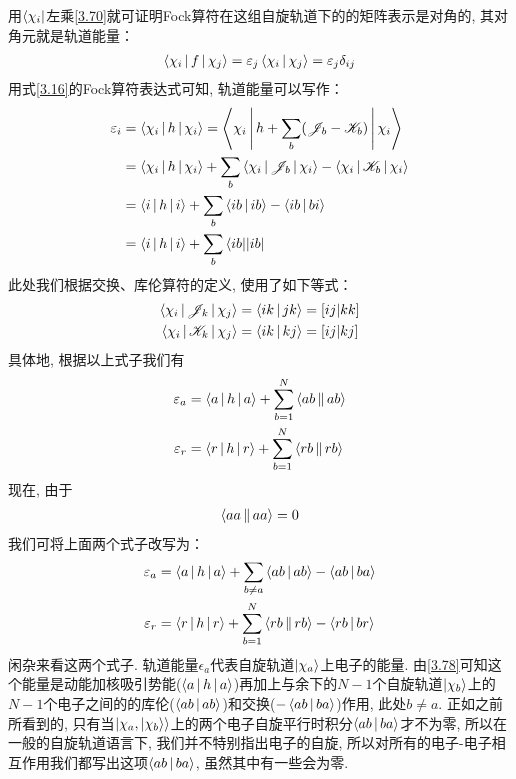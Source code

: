 用$\Bra{\chi_i}$左乘\eqref{3.70}就可证明Fock算符在这组自旋轨道下的的矩阵表示是对角的, 其对角元就是轨道能量：
\begin{align}
\Braket{\chi_i|f|\chi_j} = \varepsilon_j\Braket{\chi_i|\chi_j} = \varepsilon_j\delta_{ij}
\end{align}
用式\eqref{3.16}的Fock算符表达式可知, 轨道能量可以写作：
\begin{align}
\varepsilon_i & = \Braket{\chi_i|h|\chi_i} = \Braket{\chi_i|h+\sum_b(\mathscr{J}_b-\mathscr{K}_b)|\chi_i}\notag\\
           & = \Braket{\chi_i|h|\chi_i} + \sum_b\Braket{\chi_i|\mathscr{J}_b|\chi_i} - \Braket{\chi_i|\mathscr{K}_b|\chi_i}\notag\\
           & = \Braket{i|h|i} + \sum_b\Braket{ib|ib} - \Braket{ib|bi}\notag\\
           & = \Braket{i|h|i} + \sum_b\Bra{ib||ib}
\label{3.72}
\end{align}
此处我们根据交换、库伦算符的定义, 使用了如下等式：
\begin{align}
\Braket{\chi_i|\mathscr{J}_k|\chi_j} & = \Braket{ik|jk} = [ij|kk]\\
\Braket{\chi_i|\mathscr{K}_k|\chi_j} & = \Braket{ik|kj} = [ij|kj]
\end{align}
具体地, 根据以上式子我们有
\begin{align}
\label{3.75}
\varepsilon_a & = \Braket{a|h|a} + \sum_{b=1}^{N}\Braket{ab||ab}\\
\varepsilon_r & = \Braket{r|h|r} + \sum_{b=1}^{N}\Braket{rb||rb}
\label{3.76}
\end{align}
现在, 由于
\begin{align}
\Braket{aa||aa} = 0
\end{align}
我们可将上面两个式子改写为：
\begin{align}
\label{3.78}
\varepsilon_a & = \Braket{a|h|a} + \sum_{b\neq a}\Braket{ab|ab} - \Braket{ab|ba}\\
\varepsilon_r & = \Braket{r|h|r} + \sum_{b=1}^{N}\Braket{rb||rb} -\Braket{rb|br}
\label{3.79}
\end{align}
闲杂来看这两个式子. 轨道能量$\epsilon_a$代表自旋轨道$\Ket{\chi_a}$上电子的能量. 由\eqref{3.78}可知这个能量是动能加核吸引势能($\Braket{a|h|a}$)再加上与余下的$N-1$个自旋轨道$\Ket{\chi_b}$上的$N-1$个电子之间的的库伦($\Braket{ab|ab}$)和交换($-\Braket{ab|ba}$)作用, 此处$b \neq a$. 正如之前所看到的, 只有当$\Ket{\chi_a,\Ket{\chi_b}}$上的两个电子自旋平行时积分$\Braket{ab|ba}$才不为零, 所以在一般的自旋轨道语言下, 我们并不特别指出电子的自旋, 所以对所有的电子-电子相互作用我们都写出这项$\Braket{ab|ba}$, 虽然其中有一些会为零.

